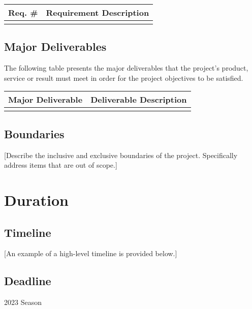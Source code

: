 \documentclass[11pt]{article}
\begin{document}
\begin{center}
\begin{tabular}{ll}
Req. \# & Requirement Description\\
\hline
 & \\
\end{tabular}
\end{center}

\subsection{Major Deliverables}
\label{sec:orgea1f733}
The following table presents the major deliverables that the project’s product, service or result must meet in order for the project objectives to be satisfied.

\begin{center}
\begin{tabular}{ll}
Major Deliverable & Deliverable Description\\
\hline
 & \\
\end{tabular}
\end{center}


\subsection{Boundaries}
\label{sec:org2a384fe}
[Describe the inclusive and exclusive boundaries of the project.  Specifically address items that are out of scope.]
\section{Duration}
\label{sec:org30e2c05}
\subsection{Timeline}
\label{sec:org960c489}
[An example of a high-level timeline is provided below.]
\subsection{Deadline}
\label{sec:orga56bdd4}
2023 Season
\end{document}

